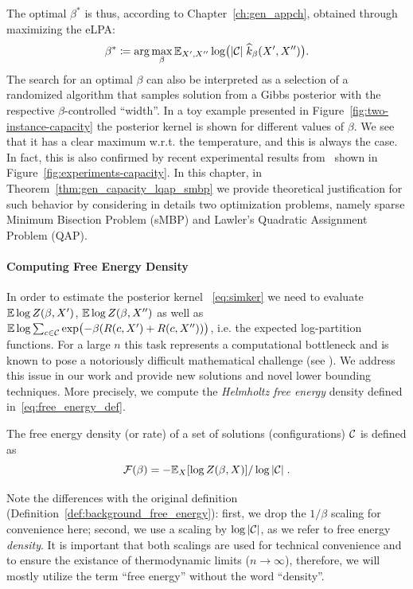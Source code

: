 The optimal $\beta^*$ is thus, according
to Chapter~\ref{ch:gen_appch}, obtained through maximizing the eLPA:
\begin{equation}
  \beta^* \coloneqq \arg \max_\beta \mathbb{E}_{X', X''} \log\bigl(|{\cal C}|\;
      \widehat{k}_\beta(X', X'') \bigr).
\end{equation} 
%
The search for an optimal $\beta$ can also be interpreted as a selection of a
randomized algorithm that samples solution from a Gibbs posterior with the
respective $\beta$-controlled ``width''. In a toy example presented in
Figure~\ref{fig:two-instance-capacity} the posterior kernel is shown for
different values of $\beta$. We see that it has a clear maximum w.r.t. the
temperature, and this is always the case. In fact, this is also confirmed by
recent experimental results from~\citep{morteza12} shown in
Figure~\ref{fig:experiments-capacity}. In this chapter, in
Theorem~\ref{thm:gen_capacity_lqap_smbp} we provide theoretical justification
for such behavior by considering in details two optimization problems, namely
sparse Minimum Bisection Problem (sMBP) and Lawler's Quadratic Assignment
Problem (QAP).

\paragraph{Computing Free Energy Density}

In order to estimate the posterior kernel ~\eqref{eq:simker} we need to evaluate
$\mathbb{E} \log Z(\beta,X')$, $\mathbb{E} \log Z(\beta, X'')$  as well as
$\mathbb{E} \log \sum_{c\in {\cal C}} \exp\bigl(-\beta (R(c,X') + R(c,X''))\bigr)$, i.e.
the expected log-partition functions.  For a large $n$ this
task represents a computational bottleneck and is known to pose a notoriously difficult
mathematical challenge (see \cite{talagrand03}). We address this issue in our
work and provide new solutions and novel lower bounding techniques. More
precisely, 
we compute the \textit{Helmholtz free energy} density defined
in~\eqref{eq:free_energy_def}.
\begin{definition}
  The free energy density (or rate) of a set of solutions (configurations) ${\cal C}$ is
  defined as
  \begin{equation}
  \label{eq:free_energy_def}
    \mathcal{F}(\beta) = -\mathbb{E}_X[\log Z( \beta, X)] / \log |{\cal C}| \;.
  \end{equation}
\end{definition}
\myremark Note the differences with the original definition
(Definition~\ref{def:background_free_energy}): first, we drop the $1/\beta$
scaling for convenience here; second, we use a scaling by $\log |{\cal C}|$, as we
refer to free energy \textit{density}. It is important that both scalings are
used for technical convenience and to ensure the existance of thermodynamic
limits ($n \to \infty$), therefore, we will mostly utilize the term ``free
energy'' without the word ``density''.



